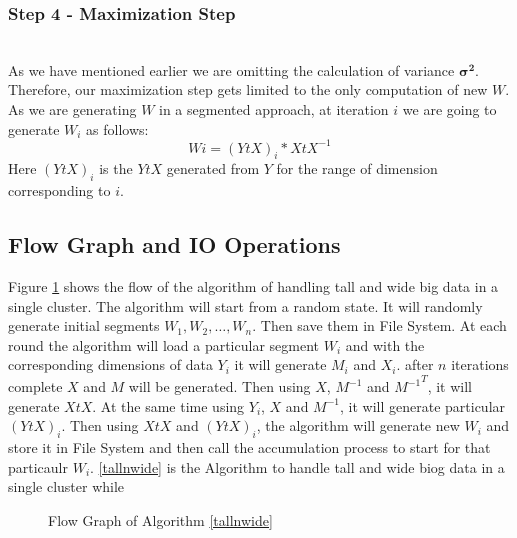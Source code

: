 \documentclass[10pt,conference,letterpaper]{IEEEtran}
\begin{document}
\subsubsection{\textbf{Step 4 - Maximization Step}}\hspace*{\fill} \\
As we have mentioned earlier we are omitting the calculation of variance $\pmb{\sigma ^2}$. Therefore, our maximization step gets limited to the only computation of new $W$. As we are generating $W$ in a segmented approach, at iteration $i$ we are going to generate $W_i$ as follows:
\begin{equation*}
    Wi = (YtX)_i * XtX^{-1}
\end{equation*}
Here $(YtX)_i$ is the $YtX$ generated from $Y$ for the range of dimension corresponding to $i$.


\subsection{Flow Graph and IO Operations}
Figure \ref{flow} shows the flow of the algorithm of handling tall and wide big data in a single cluster. The algorithm will start from a random state. It will randomly generate initial segments $W_1, W_2, \dots , W_n$. Then save them in  File System. At each round the algorithm will load a particular segment $W_i$ and with the corresponding dimensions of data $Y_i$ it will generate $M_i$ and $X_i$. after $n$ iterations complete $X$ and $M$ will be generated. Then using $X$, $M^{-1}$ and ${M^{-1}}^T$, it will generate $XtX$. At the same time using $Y_i$, $X$ and $M^{-1}$, it will generate particular $(YtX)_i$. Then using $XtX$ and $(YtX)_i$, the algorithm will generate new $W_i$ and store it in File System and then call the accumulation process to start for that particaulr $W_i$. \ref{tallnwide} is the Algorithm to handle tall and wide biog data in a single cluster while 

\begin{figure}[!htbp]
\label{flow}
\centering
{}
\caption{Flow Graph of Algorithm \ref{tallnwide}}
\end{figure}
\end{document}
